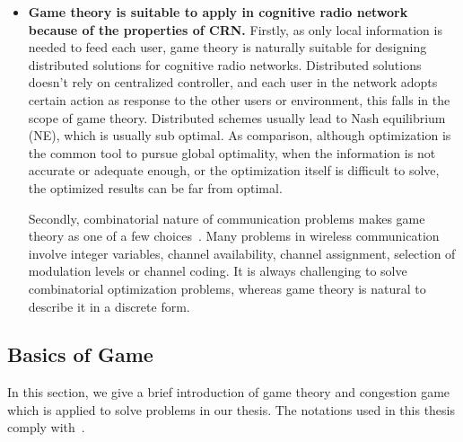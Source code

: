 \begin{itemize}
\item \textbf{Game theory is suitable to apply in cognitive radio network because of the properties of CRN.}
Firstly, as only local information is needed to feed each user, game theory is naturally suitable for designing distributed solutions for cognitive radio networks.
Distributed solutions doesn't rely on centralized controller, and each user in the network adopts certain action as response to the other users or environment, this falls in the scope of game theory.
Distributed schemes usually lead to Nash equilibrium (\gls{NE}), which is usually sub optimal.
As comparison, although optimization is the common tool to pursue global optimality, when the information is not accurate or adequate enough, or the optimization itself is difficult to solve, the optimized results can be far from optimal.

%
Secondly, combinatorial nature of communication problems makes game theory as one of a few choices~\cite{Han:2008:RAW:1457343}.
Many problems in wireless communication involve integer variables, \ie channel availability, channel assignment, selection of modulation levels or channel coding.
It is always challenging to solve combinatorial optimization problems, whereas game theory is natural to describe it in a discrete form.

\end{itemize}




 

\subsection{Basics of Game}
In this section, we give a brief introduction of game theory and congestion game which is applied to solve problems in our thesis.
The notations used in this thesis comply with~\cite{agt_book}.



